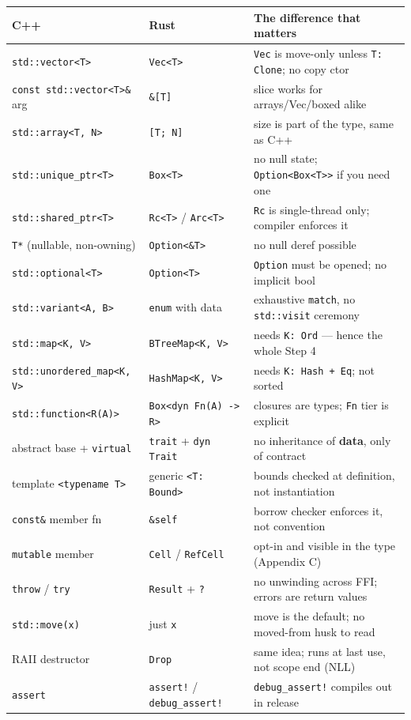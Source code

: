 \documentclass[11pt]{article}
\begin{document}
\begin{center}
\begin{tabular}{lll}
C++ & Rust & The difference that matters\\
\hline
\texttt{std::vector<T>} & \texttt{Vec<T>} & \texttt{Vec} is move-only unless \texttt{T: Clone}; no copy ctor\\
\texttt{const std::vector<T>\&} arg & \texttt{\&[T]} & slice works for arrays/Vec/boxed alike\\
\texttt{std::array<T, N>} & \texttt{[T; N]} & size is part of the type, same as C++\\
\texttt{std::unique\_ptr<T>} & \texttt{Box<T>} & no null state; \texttt{Option<Box<T>{}>{}} if you need one\\
\texttt{std::shared\_ptr<T>} & \texttt{Rc<T>} / \texttt{Arc<T>} & \texttt{Rc} is single-thread only; compiler enforces it\\
\texttt{T*} (nullable, non-owning) & \texttt{Option<\&T>} & no null deref possible\\
\texttt{std::optional<T>} & \texttt{Option<T>} & \texttt{Option} must be opened; no implicit bool\\
\texttt{std::variant<A, B>} & \texttt{enum} with data & exhaustive \texttt{match}, no \texttt{std::visit} ceremony\\
\texttt{std::map<K, V>} & \texttt{BTreeMap<K, V>} & needs \texttt{K: Ord} — hence the whole Step 4\\
\texttt{std::unordered\_map<K, V>} & \texttt{HashMap<K, V>} & needs \texttt{K: Hash + Eq}; not sorted\\
\texttt{std::function<R(A)>} & \texttt{Box<dyn Fn(A) -> R>} & closures are types; \texttt{Fn} tier is explicit\\
abstract base + \texttt{virtual} & \texttt{trait} + \texttt{dyn Trait} & no inheritance of \textbf{data}, only of contract\\
template \texttt{<typename T>} & generic \texttt{<T: Bound>} & bounds checked at definition, not instantiation\\
\texttt{const\&} member fn & \texttt{\&self} & borrow checker enforces it, not convention\\
\texttt{mutable} member & \texttt{Cell} / \texttt{RefCell} & opt-in and visible in the type (Appendix C)\\
\texttt{throw} / \texttt{try} & \texttt{Result} + \texttt{?} & no unwinding across FFI; errors are return values\\
\texttt{std::move(x)} & just \texttt{x} & move is the default; no moved-from husk to read\\
RAII destructor & \texttt{Drop} & same idea; runs at last use, not scope end (NLL)\\
\texttt{assert} & \texttt{assert!} / \texttt{debug\_assert!} & \texttt{debug\_assert!} compiles out in release\\
\end{tabular}
\end{center}
\end{document}
